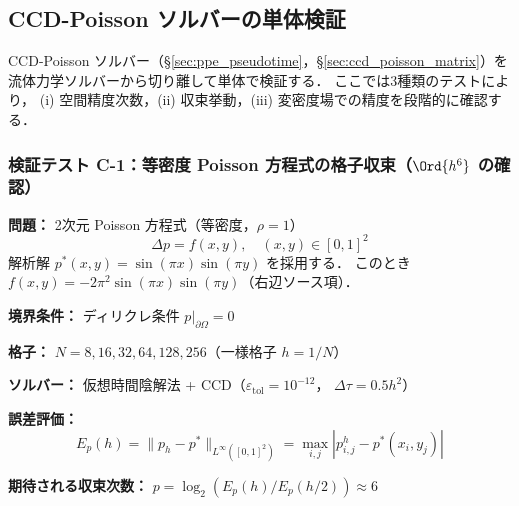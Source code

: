 \subsection{CCD-Poisson ソルバーの単体検証}
\label{sec:ccd_poisson_verification}

CCD-Poisson ソルバー（§\ref{sec:ppe_pseudotime}，§\ref{sec:ccd_poisson_matrix}）を
流体力学ソルバーから切り離して単体で検証する．
ここでは3種類のテストにより，
(i) 空間精度次数，(ii) 収束挙動，(iii) 変密度場での精度を段階的に確認する．

\subsubsection{検証テスト C-1：等密度 Poisson 方程式の格子収束（$\Ord{h^6}$ の確認）}
\label{sec:ccd_test_c1}

\begin{tcolorbox}[algbox, title={テスト C-1 の設定}]
\textbf{問題：} 2次元 Poisson 方程式（等密度，$\rho = 1$）
\[
  \Delta p = f(x,y), \quad (x,y) \in [0,1]^2
\]
解析解 $p^*(x,y) = \sin(\pi x)\sin(\pi y)$ を採用する．
このとき $f(x,y) = -2\pi^2\sin(\pi x)\sin(\pi y)$（右辺ソース項）．

\textbf{境界条件：} ディリクレ条件 $p|_{\partial\Omega} = 0$

\textbf{格子：} $N = 8, 16, 32, 64, 128, 256$（一様格子 $h = 1/N$）

\textbf{ソルバー：} 仮想時間陰解法 + CCD（$\varepsilon_{\mathrm{tol}} = 10^{-12}$，
$\Delta\tau = 0.5h^2$）

\textbf{誤差評価：}
\[
  E_p(h) = \|p_h - p^*\|_{L^\infty([0,1]^2)}
  = \max_{i,j}|p_{i,j}^h - p^*(x_i, y_j)|
\]

\textbf{期待される収束次数：} $p = \log_2(E_p(h)/E_p(h/2)) \approx 6$
\end{tcolorbox}

